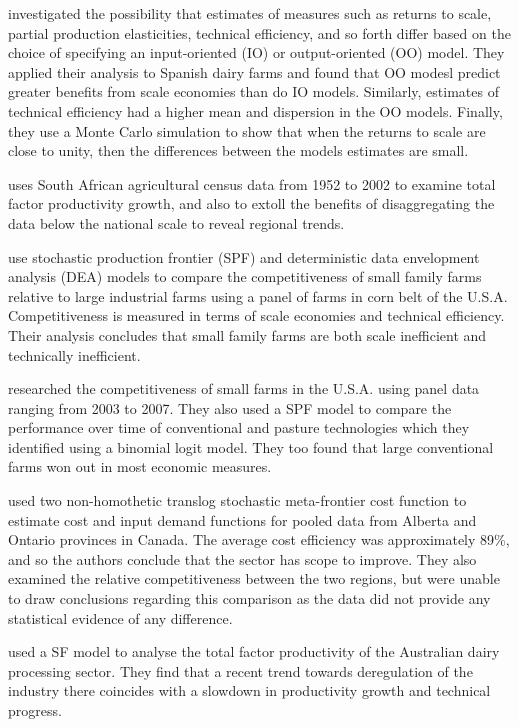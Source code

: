 \documentclass[12pt]{report}
\begin{document}
\cite{kumbhakar08a} investigated the possibility that estimates of measures such as returns to scale, partial production elasticities, technical efficiency, and so forth differ based on the choice of specifying an input-oriented (IO) or output-oriented (OO) model. They applied their analysis to Spanish dairy farms and found that OO modesl predict greater benefits from scale economies than do IO models. Similarly, estimates of technical efficiency had a higher mean and dispersion in the OO models. Finally, they use a Monte Carlo simulation to show that when the returns to scale are close to unity, then the differences between the models estimates are small. 

\cite{conradie09} uses South African agricultural census data from 1952 to 2002 to examine total factor productivity growth, and also to extoll the benefits of disaggregating the data below the national scale to reveal regional trends.

\cite{paul04} use stochastic production frontier (SPF) and deterministic data envelopment analysis (DEA) models to compare the competitiveness of small family farms relative to large industrial farms using a panel of farms in corn belt of the U.S.A. Competitiveness is measured in terms of scale economies and technical efficiency. Their analysis concludes that small family farms are both scale inefficient and technically inefficient.

\cite{nehring09} researched the competitiveness of small farms in the U.S.A. using panel data ranging from 2003 to 2007. They also used a SPF model to compare the performance over time of conventional and pasture technologies which they identified using a binomial logit model. They too found that large conventional farms won out in most economic measures. 

\cite{hailu05} used two non-homothetic translog stochastic meta-frontier cost function to estimate cost and input demand functions for pooled data from Alberta and Ontario provinces in Canada. The average cost efficiency was approximately 89\%, and so the authors conclude that the sector has scope to improve. They also examined the relative competitiveness between the two regions, but were unable to draw conclusions regarding this comparison as the data did not provide any statistical evidence of any difference. 

\cite{douc00} used a SF model to analyse the total factor productivity of the Australian dairy processing sector. They find that a recent trend towards deregulation of the industry there coincides with a slowdown in productivity growth and technical progress. %
\end{document}
